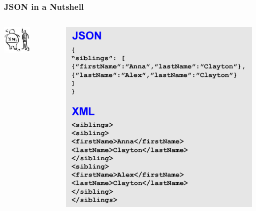 \documentclass[hyperref={pdfpagelabels=true}]{beamer}
\begin{document}
\begin{frame}
\frametitle{JSON in a Nutshell}

\begin{columns}
  \begin{column}{0.5\textwidth}
    \includegraphics[width=0.5\textwidth]{json2.jpg}  
  \end{column}
  \begin{column}{0.5\textwidth}
    \includegraphics[width=\textwidth]{json.png}    
  \end{column}  
\end{columns}

\end{frame}
\end{document}
